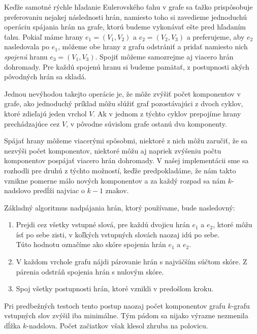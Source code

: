 Keďže samotné rýchle hľadanie Eulerovského ťahu v grafe sa ťažko prispôsobuje
preferovaniu nejakej následnosti hrán, namiesto toho si zavedieme jednoduchú
operáciu spájania hrán na grafe, ktorú budeme vykonávať ešte pred hľadaním ťahu. Pokiaľ
máme hrany $e_1 = (V_1, V_2)$ a $e_2 = (V_2, V_3)$ a preferujeme, aby $e_2$
nasledovala po $e_1$, môžeme obe hrany z grafu odstrániť a pridať namiesto nich \emph{spojenú}
hranu $e_3 = (V_1, V_3)$. Spojiť môžeme samozrejme aj viacero hrán dohromady. Pre
každú spojenú hranu si budeme pamätať, z postupnosti akých pôvodných hrán sa
skladá.

Jednou nevýhodou takejto operácie je, že môže zvýšiť počet komponentov v grafe,
ako jednoduchý príklad môžu slúžiť graf pozostávajúci z dvoch cyklov, ktoré
zdieľajú jeden vrchol $V$. Ak v jednom z týchto cyklov prepojíme hrany
prechádzajúce cez $V$, v pôvodne súvislom grafe ostanú dva komponenty.

Spájať hrany môžeme viacerými spôsobmi, niektoré z nich môžu zaručiť, že sa
nezvýši počet komponentov, niektoré môžu aj napriek zvýšeniu počtu komponentov
pospájať viacero hrán dohromady. V našej implementácii sme sa rozhodli pre druhú
z týchto možností, keďže predpokladáme, že nám takto vznikne pomerne málo nových
komponentov a za každý rozpad sa nám $k$-nadslovo predĺži najviac o $k-1$ znakov.

Základný algoritmus nadpájania hrán, ktorý používame, bude nasledovný:
\begin{enumerate}
    \item Prejdi cez všetky vstupné slová, pre každú dvojicu hrán $e_1$ a $e_2$, ktoré
          môžu ísť po sebe zisti, v koľkých vstupných slovách naozaj idú po sebe.\\
          Túto hodnotu označíme ako skóre spojenia hrán $e_1$ a $e_2$.
    \item V každom vrchole grafu nájdi párovanie hrán s najväčším súčtom skóre. Z
          párenia odstráň spojenia hrán s nulovým skóre.
    \item Spoj všetky postupnosti hrán, ktoré vznikli v predošlom kroku.
\end{enumerate}

Pri predbežných testoch tento postup naozaj počet
komponentov grafu $k$-grafu vstupných slov zvýšil iba minimálne. Tým pádom
sa nijako výrazne nezmenila dĺžka $k$-nadslova.
Počet začiatkov však klesol zhruba na polovicu.
